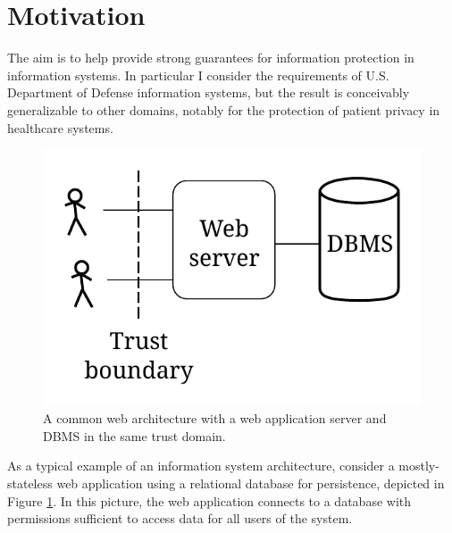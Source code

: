 \documentclass[twocolumn]{article}
\begin{document}

\section{Motivation}

The aim is to help provide strong guarantees for information protection in information systems. In particular I consider the requirements of U.S. Department of Defense information systems, but the result is conceivably generalizable to other domains, notably for the protection of patient privacy in healthcare systems.

\begin{figure}
  \begin{center}
    \includegraphics[width=0.5\linewidth]{webapp.pdf}
  \end{center}
  \caption{A common web architecture with a web application server and DBMS in the same trust domain.}
  \label{fig:webapp}
\end{figure}

As a typical example of an information system architecture, consider a mostly-stateless web application using a relational database for persistence, depicted in Figure \ref{fig:webapp}. In this picture, the web application connects to a database with permissions sufficient to access data for all users of the system.
\end{document}
